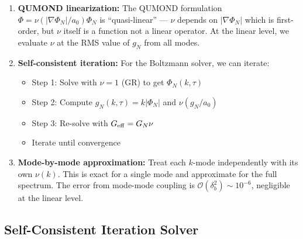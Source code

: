 \documentclass[11pt,a4paper]{article}
\begin{document}
\begin{enumerate}
\item \textbf{QUMOND linearization:} The QUMOND formulation $\Phi = \nu(|\nabla\Phi_N|/a_0)\Phi_N$ is ``quasi-linear'' --- $\nu$ depends on $|\nabla\Phi_N|$ which is first-order, but $\nu$ itself is a function not a linear operator. At the linear level, we evaluate $\nu$ at the RMS value of $g_N$ from all modes.

\item \textbf{Self-consistent iteration:} For the Boltzmann solver, we can iterate:
\begin{itemize}
\item Step 1: Solve with $\nu = 1$ (GR) to get $\Phi_N(k,\tau)$
\item Step 2: Compute $g_N(k,\tau) = k|\Phi_N|$ and $\nu(g_N/a_0)$
\item Step 3: Re-solve with $G_{\rm eff} = G_N\nu$
\item Iterate until convergence
\end{itemize}

\item \textbf{Mode-by-mode approximation:} Treat each $k$-mode independently with its own $\nu(k)$. This is exact for a single mode and approximate for the full spectrum. The error from mode-mode coupling is $\mathcal{O}(\delta_b^2) \sim 10^{-6}$, negligible at the linear level.
\end{enumerate}

\subsection{Self-Consistent Iteration Solver}
\end{document}
